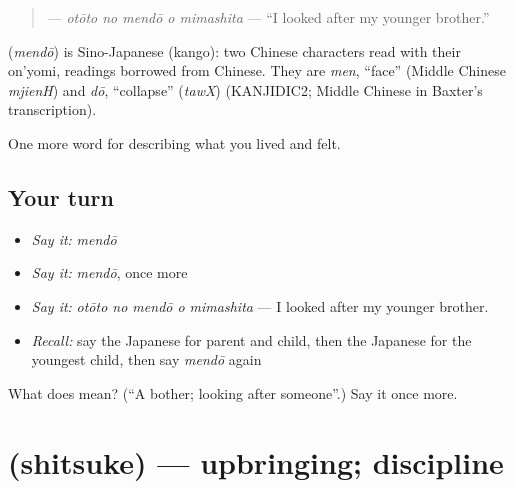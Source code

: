 \begin{quote}
\textbf{  } — \emph{otōto no mendō o mimashita} — \textquotedblleft{}I looked after my younger brother.\textquotedblright{}
\end{quote}

\begin{cousinweb}
\textbf{} (\emph{mendō}) is Sino-Japanese (kango): two Chinese characters read with their on'yomi, readings borrowed from Chinese. They are \emph{men}, \textquotedblleft{}face\textquotedblright{} (Middle Chinese \emph{mjienH}) and \emph{dō}, \textquotedblleft{}collapse\textquotedblright{} (\emph{tawX}) (KANJIDIC2; Middle Chinese in Baxter's transcription).
\end{cousinweb}

\begin{grammarlens}[title={What you've built}]
One more word for describing what you lived and felt.
\end{grammarlens}

\subsection*{Your turn}
\begin{itemize}
\raggedright
  \item \emph{Say it:} \emph{mendō}
  \item \emph{Say it:} \emph{mendō}, once more
  \item \emph{Say it:} \emph{otōto no mendō o mimashita} — I looked after my younger brother.
  \item \emph{Recall:} say the Japanese for parent and child, then the Japanese for the youngest child, then say \emph{mendō} again
\end{itemize}

\begin{tcolorbox}[breakable,colback=teal!4,colframe=teal!35!black,title={Before you move on}]
What does  mean? (\textquotedblleft{}A bother; looking after someone\textquotedblright{}.) Say it once more.
\end{tcolorbox}
\section[\texorpdfstring{\ja{しつけ} (shitsuke)}{しつけ (shitsuke)}]{ (shitsuke) — upbringing; discipline}

\label{lesson:JA-C477-shitsuke}



